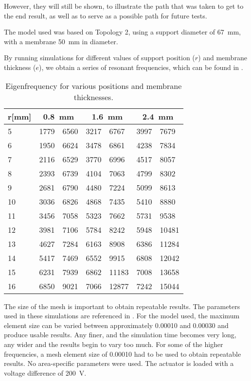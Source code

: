 However, they will still be shown, to illustrate the path that was taken to get
to the end result, as well as to serve as a possible path for future tests.

The model used was based on Topology 2, using a support diameter of
\SI{67}{\milli\metre}, with a membrane \SI{50}{\milli\metre} in diameter. 

By running simulations for different values of support position ($r$) and
membrane thickness ($e$), we obtain a series of resonant frequencies, which can
be found in .

\begin{table}[h]
  \centering
    \begin{tabular}{l|l|l|l|l|l|l}
      r[mm]  & \multicolumn{2}{c|}{\SI{0.8}{\milli\metre}} &
		 \multicolumn{2}{c|}{\SI{1.6}{\milli\metre}} & 
		 \multicolumn{2}{c}{\SI{2.4}{\milli\metre}} \\
        \hline
        5  & 1779 & 6560 & 3217 & 6767  & 3997 & 7679  \\ 
        6  & 1950 & 6624 & 3478 & 6861  & 4238 & 7834  \\ 
        7  & 2116 & 6529 & 3770 & 6996  & 4517 & 8057  \\ 
        8  & 2393 & 6739 & 4104 & 7063  & 4799 & 8302  \\ 
        9  & 2681 & 6790 & 4480 & 7224  & 5099 & 8613  \\ 
        10 & 3036 & 6826 & 4868 & 7435  & 5410 & 8880  \\ 
        11 & 3456 & 7058 & 5323 & 7662  & 5731 & 9538  \\ 
        12 & 3981 & 7106 & 5784 & 8242  & 5948 & 10481 \\ 
        13 & 4627 & 7284 & 6163 & 8908  & 6386 & 11284 \\ 
        14 & 5417 & 7469 & 6552 & 9915  & 6808 & 12042 \\ 
        15 & 6231 & 7939 & 6862 & 11183 & 7008 & 13658 \\ 
        16 & 6850 & 9021 & 7066 & 12877 & 7242 & 15044 \\
    \end{tabular}
    \caption{Eigenfrequency for various positions and membrane thicknesses.}
    \label{tab:eigenfrequencies}
\end{table}

The size of the mesh is important to obtain repeatable results. The parameters
used in these simulations are referenced in . For the model used,
the maximum element size can be varied between approximately 0.00010 and 0.00030
and produce usable results. Any finer, and the simulation time becomes very
long, any wider and the results begin to vary too much. For some of the higher
frequencies, a mesh element size of 0.00010 had to be used to obtain repeatable
results.  No area-specific parameters were used. The actuator is loaded with a
voltage difference of \SI{200}{\volt}.

